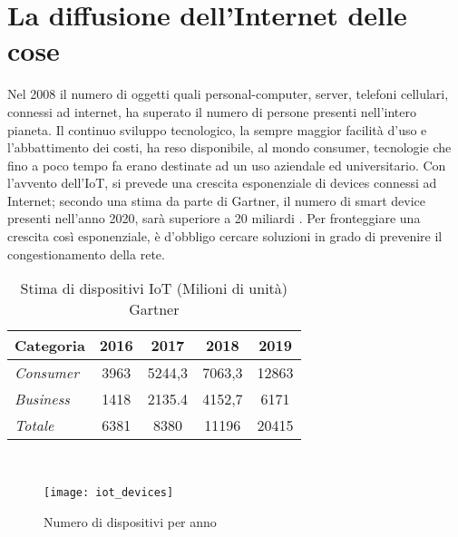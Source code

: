 \section{La diffusione dell'Internet delle cose}
Nel 2008\bx{,} il numero di oggetti quali personal-computer, server, telefoni cellulari,
connessi ad internet, ha superato il numero di persone presenti nell'intero
pianeta. Il continuo sviluppo tecnologico, la sempre maggior facilità d'uso e
l'abbattimento dei costi, ha reso disponibile, al mondo consumer, tecnologie che
fino a poco tempo fa erano destinate ad un uso aziendale ed universitario. 
Con l'avvento dell'IoT, si prevede una crescita esponenziale di devices connessi
ad Internet;  secondo  una stima da parte di Gartner, il numero di smart
device presenti nell'anno 2020, sarà superiore a 20 miliardi \cite{gartner2016}.
Per fronteggiare una crescita così esponenziale, è d'obbligo cercare soluzioni
in grado di prevenire il congestionamento della rete. 
\\
\begin{table}[h]
        \centering
        \begin{tabular}{l|c|c|c|c}
                \textbf{Categoria}  & 2016 & 2017 & 2018 & 2019 \\
                \hline
                \emph{Consumer}  & 3963 & 5244,3 & 7063,3 & 12863 \\
                \emph{Business}  & 1418 & 2135.4 & 4152,7 & 6171  \\
                \emph{Totale }   & 6381 & 8380   & 11196  & 20415 \\
        \end{tabular}
        \caption{Stima di dispositivi IoT (Milioni di unità)
        Gartner\cite{gartner2016}}
\end{table}
\\
\begin{figure}[h]
        \centering 
                \texttt{[image: iot\_devices]}
        \caption{Numero di dispositivi per anno}
\end{figure}

